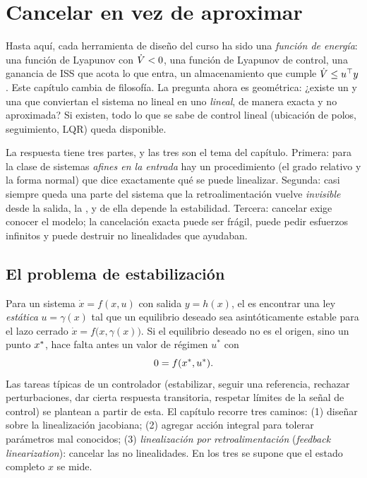 \section{Cancelar en vez de aproximar}
\label{sec:fl-por-que}

Hasta aquí, cada herramienta de diseño del curso ha sido una \emph{función de energía}: una función de Lyapunov con $\dot V<0$, una función de Lyapunov de control, una ganancia de ISS que acota lo que entra, un almacenamiento que cumple $\dot V\le u^{\top} y$. Este capítulo cambia de filosofía. La pregunta ahora es geométrica: ¿existe un  y una  que conviertan el sistema no lineal en uno \emph{lineal}, de manera exacta y no aproximada? Si existen, todo lo que se sabe de control lineal (ubicación de polos, seguimiento, LQR) queda disponible.


La respuesta tiene tres partes, y las tres son el tema del capítulo. Primera: para la clase de sistemas \emph{afines en la entrada} hay un procedimiento (el grado relativo y la forma normal) que dice exactamente qué se puede linealizar. Segunda: casi siempre queda una parte del sistema que la retroalimentación vuelve \emph{invisible} desde la salida, la , y de ella depende la estabilidad. Tercera: cancelar exige conocer el modelo; la cancelación exacta puede ser frágil, puede pedir esfuerzos infinitos y puede destruir no linealidades que ayudaban.

\subsection{El problema de estabilización}

Para un sistema $\dot x=f(x,u)$ con salida $y=h(x)$, el  es encontrar una ley \emph{estática} $u=\gamma(x)$ tal que un equilibrio deseado sea asintóticamente estable para el lazo cerrado $\dot x=f\bigl(x,\gamma(x)\bigr)$. Si el equilibrio deseado no es el origen, sino un punto $x^{*}$, hace falta antes un valor de régimen $u^*$ con
\begin{equation}
  0=f(x^{*},u^*) .
  \label{eq:fl-regimen}
\end{equation}
Las tareas típicas de un controlador (estabilizar, seguir una referencia, rechazar perturbaciones, dar cierta respuesta transitoria, respetar límites de la señal de control) se plantean a partir de esta. El capítulo recorre tres caminos: (1) diseñar sobre la linealización jacobiana; (2) agregar acción integral para tolerar parámetros mal conocidos; (3) \emph{linealización por retroalimentación} (\emph{feedback linearization}): cancelar las no linealidades. En los tres se supone que el estado completo $x$ se mide.

